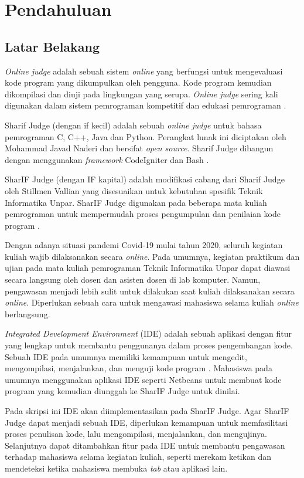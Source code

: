\chapter{Pendahuluan}
\label{chap:intro}
   
\section{Latar Belakang}
\label{sec:label}

\textit{Online judge} adalah sebuah sistem \textit{online} yang berfungsi untuk mengevaluasi kode program yang dikumpulkan oleh pengguna. Kode program kemudian dikompilasi dan diuji pada lingkungan yang serupa. \textit{Online judge} sering kali digunakan dalam sistem pemrograman kompetitif dan edukasi pemrograman \cite{judge}.

Sharif Judge (dengan if kecil) adalah sebuah \textit{online judge} untuk bahasa pemrograman C, C++, Java dan Python. Perangkat lunak ini diciptakan oleh Mohammad Javad Naderi dan bersifat \textit{open
source}. Sharif Judge dibangun dengan menggunakan \textit{framework} CodeIgniter dan Bash \cite{sharif}.

SharIF Judge (dengan IF kapital) adalah modifikasi cabang dari Sharif Judge oleh Stillmen Vallian yang disesuaikan untuk kebutuhan spesifik Teknik Informatika Unpar. SharIF Judge digunakan pada beberapa mata kuliah pemrograman untuk mempermudah proses pengumpulan dan penilaian kode program \cite{stillmen:sharif}.

Dengan adanya situasi pandemi Covid-19 mulai tahun 2020, seluruh kegiatan kuliah wajib dilaksanakan secara \textit{online}. Pada umumnya, kegiatan praktikum dan ujian pada mata kuliah pemrograman Teknik Informatika Unpar dapat diawasi secara langsung oleh dosen dan asisten dosen di lab komputer.  Namun, pengawasan menjadi lebih sulit untuk dilakukan saat kuliah dilaksanakan secara \textit{online}. Diperlukan sebuah cara untuk mengawasi mahasiswa selama kuliah \textit{online} berlangsung. 

{\it Integrated Development Environment} (IDE) adalah sebuah aplikasi dengan fitur yang lengkap untuk membantu penggunanya dalam proses pengembangan kode. Sebuah IDE pada umumnya memiliki kemampuan untuk mengedit, mengompilasi, menjalankan, dan menguji kode program \cite{ide}.  Mahasiswa pada umumnya menggunakan aplikasi IDE seperti Netbeans untuk membuat kode program yang kemudian diunggah ke SharIF Judge untuk dinilai.

Pada skripsi ini IDE akan diimplementasikan pada SharIF Judge. Agar SharIF Judge dapat menjadi sebuah IDE, diperlukan kemampuan untuk memfasilitasi proses penulisan kode, lalu mengompilasi, menjalankan, dan mengujinya. Selanjutnya dapat ditambahkan fitur pada IDE untuk membantu pengawasan terhadap mahasiswa selama kegiatan kuliah, seperti merekam ketikan dan mendeteksi ketika mahasiswa membuka \textit{tab} atau aplikasi lain.

